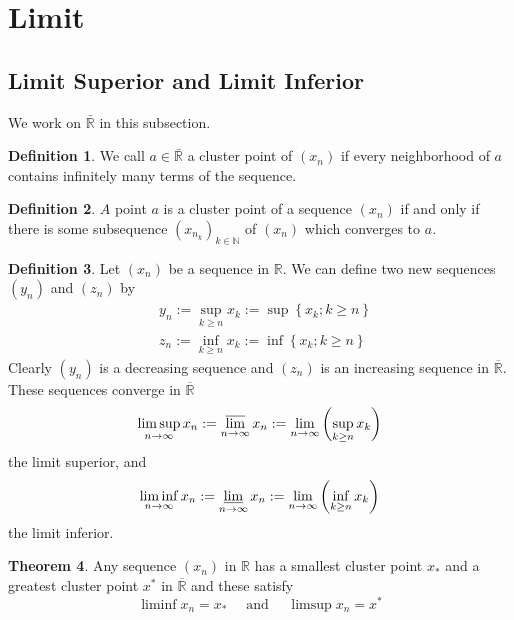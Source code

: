 \documentclass[12pt,a4paper]{book}
\newcommand{\bb}[1]{\mathbb{#1}}
\theoremstyle{definition}
\newtheorem{defn}{Definition}[section]
\newtheorem{theo}[defn]{Theorem}
\begin{document}
\section{Limit}
\subsection{Limit Superior and Limit Inferior}
We work on $\bar{\bb{R}}$ in this subsection.
\begin{defn}
    We call $a \in \bar{\bb{R}}$ a cluster point of $\left(x_n\right)$ if every neighborhood of $a$ contains infinitely many terms of the sequence.
\end{defn}
\begin{defn}
$A$ point $a$ is a cluster point of a sequence $\left(x_n\right)$ if and only if there is some subsequence $\left(x_{n_k}\right)_{k \in \mathbb{N}}$ of $\left(x_n\right)$ which converges to $a$.
\end{defn}
\begin{defn}
Let $\left(x_n\right)$ be a sequence in $\mathbb{R}$. We can define two new sequences $\left(y_n\right)$ and $\left(z_n\right)$ by
    $$
    \begin{aligned}
    & y_n:=\sup _{k \geq n} x_k:=\sup \left\{x_k ; k \geq n\right\} \\
    & z_n:=\inf _{k \geq n} x_k:=\inf \left\{x_k ; k \geq n\right\}
    \end{aligned}
    $$
    Clearly $\left(y_n\right)$ is a decreasing sequence and $\left(z_n\right)$ is an increasing sequence in $\overline{\mathbb{R}}$. These sequences converge in $\overline{\mathbb{R}}$  
    $$
    \limsup _{n \rightarrow \infty} x_n:=\varlimsup_{n \rightarrow \infty} x_n:=\lim _{n \rightarrow \infty}\left(\sup _{k \geq n} x_k\right)
    $$
    the limit superior, and
    $$
    \liminf_{n \rightarrow \infty} x_n:=\varliminf_{n \rightarrow \infty} x_n:=\lim _{n \rightarrow \infty}\left(\inf_{k \geq n} x_k\right)
    $$
    the limit inferior.
\end{defn}
\begin{theo}
    Any sequence $\left(x_n\right)$ in $\mathbb{R}$ has a smallest cluster point $x_*$ and a greatest cluster point $x^*$ in $\overline{\mathbb{R}}$ and these satisfy
    $$
    \liminf x_n=x_* \quad \text { and } \quad \limsup x_n=x^*
     $$
\end{theo}
\end{document}
